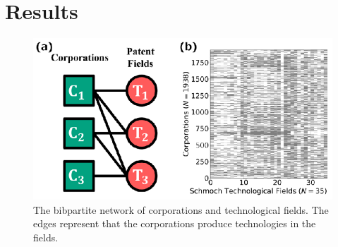 \documentclass[fleqn,10pt]{wlscirep}
\begin{document}
\section*{Results}

\begin{figure}[ht]
    \centering
    \includegraphics[scale=1]{Figs/Fig1.eps}
    \caption{The bibpartite network of corporations and technological fields. The edges represent that the corporations produce technologies in the fields.}
    \label{fig:bipartite}
\end{figure}
\end{document}
